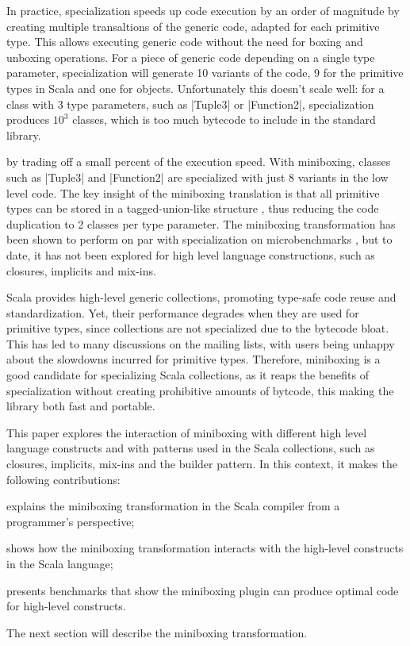  In practice, specialization speeds up code execution by an order of magnitude \cite{erik-spire} by creating multiple transaltions of the generic code, adapted for each primitive type. This allows executing generic code without the need for boxing and unboxing operations. For a piece of generic code depending on a single type parameter, specialization will generate 10 variants of the code, 9 for the primitive types in Scala and one for objects. Unfortunately this doesn't scale well: for a class with 3 type parameters, such as |Tuple3| or |Function2|, specialization produces $10^3$ classes, which is too much bytecode to include in the standard library.

 by trading off a small percent of the execution speed. With miniboxing, classes such as |Tuple3| and |Function2| are specialized with just 8 variants in the low level code. The key insight of the miniboxing translation is that all primitive types can be stored in a tagged-union-like structure \cite{tagged-unions-lua}, thus reducing the code duplication to 2 classes per type parameter. The miniboxing transformation has been shown to perform on par with specialization on microbenchmarks \cite{miniboxing}, but to date, it has not been explored for high level language constructions, such as closures, implicits and mix-ins.

Scala provides high-level generic collections, promoting type-safe code reuse and standardization. Yet, their performance degrades when they are used for primitive types, since collections are not specialized due to the bytecode bloat. This has led to many discussions on the mailing lists, with users being unhappy about the slowdowns incurred for primitive types. Therefore, miniboxing is a good candidate for specializing Scala collections, as it reaps the benefits of specialization without creating prohibitive amounts of bytcode, this making the library both fast and portable.

This paper explores the interaction of miniboxing with different high level language constructs and with patterns used in the Scala collections, such as closures, implicits, mix-ins and the builder pattern. In this context, it makes the following contributions:

\begin{packed_item}
\item explains the miniboxing transformation in the Scala compiler from a programmer's perspective;
\item shows how the miniboxing transformation interacts with the high-level constructs in the Scala language;
\item presents benchmarks that show the miniboxing plugin can produce optimal code for high-level constructs.
\end{packed_item}

The next section will describe the miniboxing transformation. 